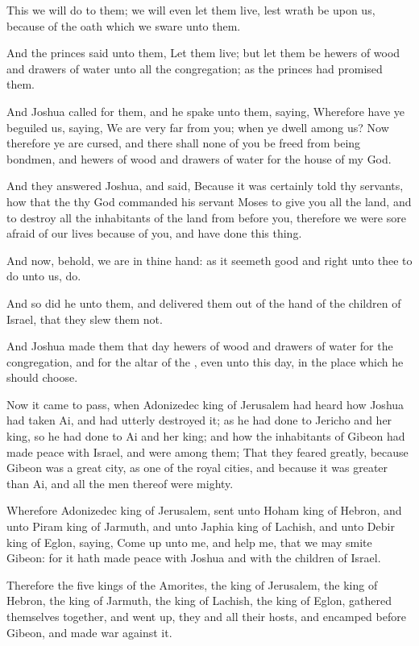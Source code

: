 \Verse This we will do to them; we will even let them live, lest wrath be upon us, because of the oath which we sware unto them.

\Verse And the princes said unto them, Let them live; but let them be hewers of wood and drawers of water unto all the congregation; as the princes had promised them.

\Verse And Joshua called for them, and he spake unto them, saying, Wherefore have ye beguiled us, saying, We are very far from you; when ye dwell among us?  \Verse Now therefore ye are cursed, and there shall none of you be freed from being bondmen, and hewers of wood and drawers of water for the house of my God.

\Verse And they answered Joshua, and said, Because it was certainly told thy servants, how that the \LORD thy God commanded his servant Moses to give you all the land, and to destroy all the inhabitants of the land from before you, therefore we were sore afraid of our lives because of you, and have done this thing.

\Verse And now, behold, we are in thine hand: as it seemeth good and right unto thee to do unto us, do.

\Verse And so did he unto them, and delivered them out of the hand of the children of Israel, that they slew them not.

\Verse And Joshua made them that day hewers of wood and drawers of water for the congregation, and for the altar of the \LORD, even unto this day, in the place which he should choose.


\Chapter
\Verse Now it came to pass, when Adonizedec king of Jerusalem had heard how Joshua had taken Ai, and had utterly destroyed it; as he had done to Jericho and her king, so he had done to Ai and her king; and how the inhabitants of Gibeon had made peace with Israel, and were among them; \Verse That they feared greatly, because Gibeon was a great city, as one of the royal cities, and because it was greater than Ai, and all the men thereof were mighty.

\Verse Wherefore Adonizedec king of Jerusalem, sent unto Hoham king of Hebron, and unto Piram king of Jarmuth, and unto Japhia king of Lachish, and unto Debir king of Eglon, saying, \Verse Come up unto me, and help me, that we may smite Gibeon: for it hath made peace with Joshua and with the children of Israel.

\Verse Therefore the five kings of the Amorites, the king of Jerusalem, the king of Hebron, the king of Jarmuth, the king of Lachish, the king of Eglon, gathered themselves together, and went up, they and all their hosts, and encamped before Gibeon, and made war against it.

